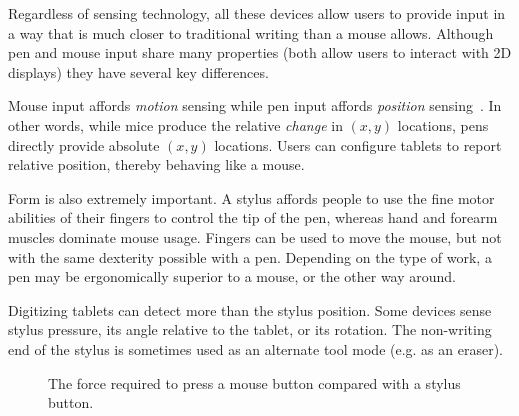 Regardless of sensing technology, all these devices allow users to
provide input in a way that is much closer to traditional writing than
a mouse allows. Although pen and mouse input share many properties
(both allow users to interact with 2D displays) they have several key
differences.

Mouse input affords \textit{motion} sensing while pen input
affords \textit{position} sensing~\cite{hinckley-input-technology}. In
other words, while mice produce the relative \textit{change} in
$(x,y)$ locations, pens directly provide absolute $(x,y)$ locations.
Users can configure tablets to report relative position, thereby
behaving like a mouse.

Form is also extremely important. A stylus affords people to use the
fine motor abilities of their fingers to control the tip of the pen,
whereas hand and forearm muscles dominate mouse usage. Fingers can be
used to move the mouse, but not with the same dexterity possible with
a pen. Depending on the type of work, a pen may be ergonomically
superior to a mouse, or the other way around.

Digitizing tablets can detect more than the stylus position. Some
devices sense stylus pressure, its angle relative to the tablet, or
its rotation. The non-writing end of the stylus is sometimes used as
an alternate tool mode (e.g. as an eraser).

\begin{figure}
\centering 

\hspace{1cm} 
\caption{The force required to press a mouse button compared with a
  stylus button.}
\label{fig:button-force}
\end{figure}

